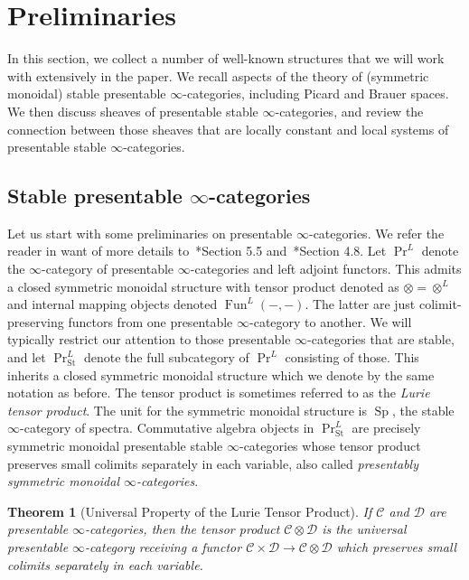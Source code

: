 \documentclass[10pt]{amsart}
\theoremstyle{plain}
\newtheorem{theorem}{Theorem}[subsection]
\theoremstyle{definition}
\DeclareMathOperator{\Sp}{Sp}
\DeclareMathOperator{\Fun}{Fun}
\newcommand{\St}{\mathrm{St}}
\newcommand{\cC}{\mathcal{C}}
\newcommand{\cd}{\mathcal{D}}
\begin{document}
\section{Preliminaries}

In this section, we collect a number of well-known structures that we will work with extensively in the paper.
We recall aspects of the theory of (symmetric monoidal) stable presentable $\infty$-categories, including Picard and Brauer spaces.
We then discuss sheaves of presentable stable $\infty$-categories, and review the connection between those sheaves that are locally constant and local systems of presentable stable $\infty$-categories.

\subsection{Stable presentable $\infty$-categories}

Let us start with some preliminaries on presentable $\infty$-categories.
We refer the reader in want of more details to~\cite{HTT}*{Section 5.5} and~\cite{HA}*{Section 4.8}.
Let $\Pr^{L}$ denote the $\infty$-category of presentable $\infty$-categories and left adjoint functors.
This admits a closed symmetric monoidal structure with tensor product denoted as $\otimes = \otimes^L$ and internal mapping objects denoted $\Fun^L(-,-)$.
The latter are just colimit-preserving functors from one presentable $\infty$-category to another.
We will typically restrict our attention to those presentable $\infty$-categories that are stable, and let $\Pr^L_{\St}$ denote the full subcategory of $\Pr^L$ consisting of those.
This inherits a closed symmetric monoidal structure which we denote by the same notation as before.
The tensor product is sometimes referred to as the \emph{Lurie tensor product}.
The unit for the symmetric monoidal structure is $\Sp$, the stable $\infty$-category of spectra.
Commutative algebra objects in $\Pr^{L}_{\St}$ are precisely symmetric monoidal presentable stable $\infty$-categories whose tensor product preserves small colimits separately in each variable, also called \emph{presentably symmetric monoidal $\infty$-categories}.

\begin{theorem}[Universal Property of the Lurie Tensor Product] \label{thm:uni_prop_tensor_PrLSt}
If $\cC$ and $\cd$ are presentable $\infty$-categories, then the tensor product $\cC \otimes \cd$ is the universal presentable $\infty$-category receiving a functor $\cC \times \cd \to \cC \otimes \cd$ which preserves small colimits separately in each variable.
\end{theorem}
\end{document}
